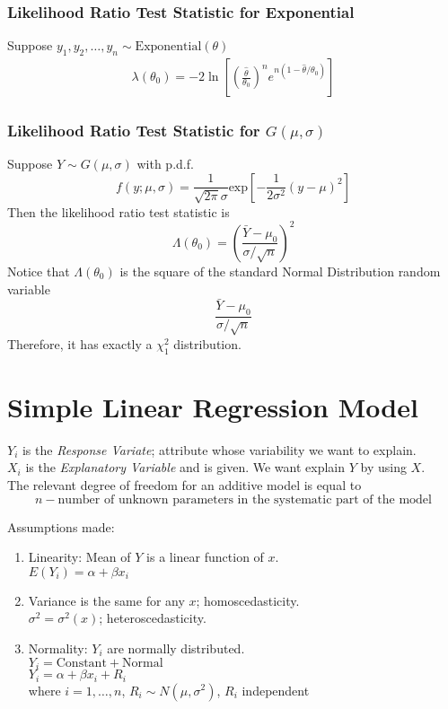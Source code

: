 \documentclass[12pt]{article}
\theoremstyle{definition}
\begin{document}
  \subsubsection{Likelihood Ratio Test Statistic for Exponential}
  Suppose $y_1, y_2, \dots, y_n \sim \text{Exponential}(\theta)$
  \begin{align*}
    \lambda(\theta_0) = -2
    \ln{
    \left[
      \left(\frac{\hat{\theta}}{\theta_0}\right)^{n}
      e^{n(1 - \hat{\theta}/\theta_0)}
    \right]
    }
  \end{align*}

  \subsubsection{Likelihood Ratio Test Statistic for $G(\mu, \sigma)$}
  Suppose $Y \sim G(\mu, \sigma)$ with p.d.f.
  $$
  f(y; \mu, \sigma) =
  \frac{1}{\sqrt{2\pi}\sigma}
  \text{exp}\left[-\frac{1}{2\sigma^{2}}(y - \mu)^{2}\right]
  $$
  Then the likelihood ratio test statistic is
  $$
  \Lambda(\theta_0) =
  \left(\frac{\bar{Y} - \mu_0}{\sigma/\sqrt{n}}
  \right)^{2}
  $$
  Notice that $\Lambda(\theta_0)$ is the square of the standard Normal Distribution random variable
  $$\frac{\bar{Y} - \mu_0}{\sigma/\sqrt{n}}$$
  Therefore, it has exactly a $\chi_{1}^{2}$ distribution.

  \newpage
  \section{Simple Linear Regression Model}
  $Y_{i}$ is the \emph{Response Variate}; attribute whose variability we want to explain. \\
  $X_{i}$ is the \emph{Explanatory Variable} and is given.
  We want explain $Y$ by using $X$. \\

  The relevant degree of freedom for an additive model is equal to
  $$n - \text{number of unknown parameters in the systematic part of the model}$$

  Assumptions made:
  \begin{enumerate}
    \item Linearity: Mean of $Y$ is a linear function of $x$.\\
    $E(Y_{i}) = \alpha + \beta x_{i}$
    \item Variance is the same for any $x$; homoscedasticity. \\
    $\sigma^{2} = \sigma^{2}(x)$; heteroscedasticity.
    \item Normality: $Y_{i}$ are normally distributed. \\
    $Y_{i} = \text{Constant} + \text{Normal}$ \\
    $Y_{i} = \alpha + \beta x_{i} + R_{i}$ \\
    where $i = 1, \dots, n$, $R_{i} \sim N(\mu, \sigma^{2})$, $R_{i}$ independent
  \end{enumerate}
\end{document}
